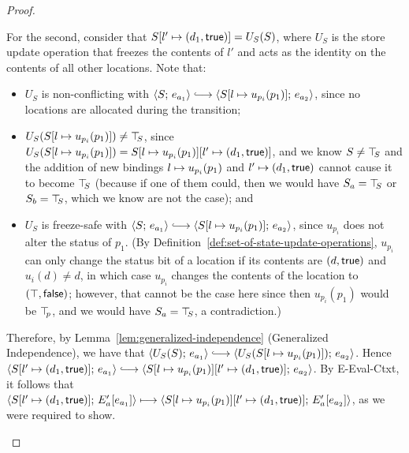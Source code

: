 \begin{proof}
\begin{enumerate}
\begin{enumerate}
\begin{itemize}
          For the second, consider that
          $S[l' \mapsto (d_1, \textsf{true})] = U_S(S)$, where $U_S$ is
          the store update operation that freezes the contents of $l'$
          and acts as the identity on the contents of all other
          locations.  Note that:
          \begin{itemize}
          \item $U_S$ is non-conflicting with $\config{S}{e_{a_1}}
            \parstepsto
            \config{\extSRaw{S}{l}{u_{p_i}(p_1)}}{e_{a_2}}$, since no
            locations are allocated during the transition;
          \item $U_S(S[l \mapsto u_{p_i}(p_1)]) \neq \top\hspace{-0.85mm}_{S}$, since
            $U_S(S[l \mapsto u_{p_i}(p_1)]) =
            S[l \mapsto u_{p_i}(p_1)][l' \mapsto (d_1, \textsf{true})]$,
            and we know $S \neq \top\hspace{-0.85mm}_{S}$ and the addition of new
            bindings $l \mapsto u_{p_i}(p_1)$ and
            $l' \mapsto (d_1, \textsf{true})$ cannot cause it to
            become $\top\hspace{-0.85mm}_{S}$ (because if one of them could, then we
            would have $S_a = \top\hspace{-0.85mm}_{S}$ or $S_b = \top\hspace{-0.85mm}_{S}$, which we know
            are not the case); and
          \item $U_S$ is freeze-safe with $\config{S}{e_{a_1}}
            \parstepsto
            \config{\extSRaw{S}{l}{u_{p_i}(p_1)}}{e_{a_2}}$, since
            $u_{p_i}$ does not alter the status of $p_1$.    (By
            Definition~\ref{def:set-of-state-update-operations},
            $u_{p_i}$ can only change the status bit of a location if
            its contents are $(d, \textsf{true})$ and $u_i(d) \neq
            d$, in which case $u_{p_i}$ changes the contents of the
            location to $(\top, \textsf{false})$; however, that
            cannot be the case here since then $u_{p_i}(p_1)$ would be
            $\top\hspace{-0.85mm}_{p}$, and we would have $S_a = \top\hspace{-0.85mm}_{S}$, a contradiction.)
          \end{itemize}
          Therefore, by Lemma~\ref{lem:generalized-independence}
          (Generalized Independence), we have that
          $\config{U_S(S)}{e_{a_1}} \parstepsto
          \config{U_S(\extSRaw{S}{l}{u_{p_i}(p_1)})}{e_{a_2}}$.  Hence
          $\config{\extS{S}{l'}{d_1}{\frozentrue}}{e_{a_1}}
          \parstepsto
          \config{\extS{\extSRaw{S}{l}{u_{p_i}(p_1)}}{l'}{d_1}{\frozentrue}}{e_{a_2}}$.
          By {\sc E-Eval-Ctxt}, it follows that
          $\langle S[l' \mapsto (d_1, \textsf{true})];\, E'_a\hspace{-0.5mm}\left[e_{a_1}\right] \rangle
          \longmapsto
          \langle S[l \mapsto u_{p_i}(p_1)][l' \mapsto (d_1, \textsf{true})];\, E'_a\hspace{-0.5mm}\left[e_{a_2}\right] \rangle$,
          as we were required to show.


\end{itemize}
\end{enumerate}
\end{enumerate}
\end{proof}
